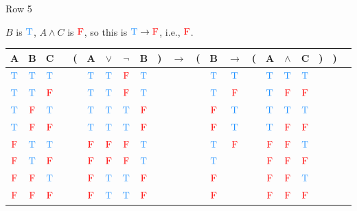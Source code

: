 \documentclass[
  ignorenonframetext,
]{beamer}
\renewcommand{\,}{\text{, }}
\def\True{\textcolor{dodgerblue}{\text{T}}}
\def\False{\textcolor{red}{\text{F}}}
\begin{document}
\begin{frame}{Row 5}
\protect\hypertarget{row-5}{}

\(B\) is \(\True\), \(A \wedge C\) is \(\False\), so this is
\(\True \rightarrow \False\), i.e., \(\False\).

\begin{center}
\bigskip
\begin{tabular}{@{ }c@{ }@{ }c@{ }@{ }c | c@{ }@{}c@{}@{ }c@{ }@{ }c@{ }@{ }c@{ }@{ }c@{ }@{}c@{}@{ }c@{ }@{}c@{}@{ }c@{ }@{ }c@{ }@{}c@{}@{ }c@{ }@{ }c@{ }@{ }c@{ }@{}c@{}@{}c@{}@{ }c}
A & B & C &  & ( & A & $\vee$ & $\neg$ & B & ) & $\rightarrow$ & ( & B & $\rightarrow$ & ( & A & $\wedge$ & C & ) & ) & \\
\hline 
 $\True$ & $\True$ & $\True$ &  &  & $\True$ & $\True$ & $\False$ & $\True$ &  &&  & $\True$ & $\True$ &  & $\True$ & $\True$ & $\True$ &  &  & \\
 $\True$ & $\True$ & $\False$ &  &  & $\True$ & $\True$ & $\False$ & $\True$ &  &&  & $\True$ & $\False$ &  & $\True$ & $\False$ & $\False$ &  &  & \\
 $\True$ & $\False$ & $\True$ &  &  & $\True$ & $\True$ & $\True$ & $\False$ &  &&  & $\False$ & $\True$ &  & $\True$ & $\True$ & $\True$ &  &  & \\
 $\True$ & $\False$ & $\False$ &  &  & $\True$ & $\True$ & $\True$ & $\False$ &  &&  & $\False$ & $\True$ &  & $\True$ & $\False$ & $\False$ &  &  & \\
 $\False$ & $\True$ & $\True$ &  &  & $\False$ & $\False$ & $\False$ & $\True$ &  &&  & $\True$ & $\False$ &  & $\False$ & $\False$ & $\True$ &  &  & \\
 $\False$ & $\True$ & $\False$ &  &  & $\False$ & $\False$ & $\False$ & $\True$ &  &&  & $\True$ &&  & $\False$ & $\False$ & $\False$ &  &  & \\
 $\False$ & $\False$ & $\True$ &  &  & $\False$ & $\True$ & $\True$ & $\False$ &  &&  & $\False$ &&  & $\False$ & $\False$ & $\True$ &  &  & \\
 $\False$ & $\False$ & $\False$ &  &  & $\False$ & $\True$ & $\True$ & $\False$ &  &&  & $\False$ &&  & $\False$ & $\False$ & $\False$ &  &  & \\
\end{tabular}
\bigskip
\end{center}

\end{frame}
\end{document}
